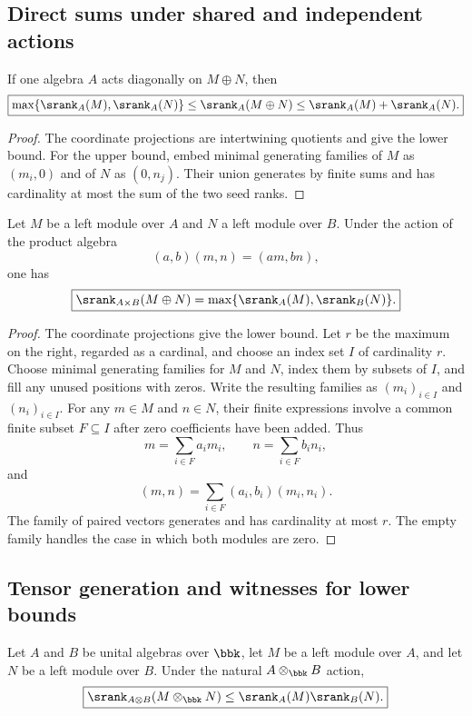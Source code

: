 \subsection{Direct sums under shared and independent actions}
\begin{proposition}
\label{prop:shared-direct-sum}
If one algebra $A$ acts diagonally on $M\oplus N$, then
\[
\boxed{
\max\{\srank_A(M),\srank_A(N)\}
\leq\srank_A(M\oplus N)
\leq\srank_A(M)+\srank_A(N).
}
\]
\end{proposition}

\begin{proof}
The coordinate projections are intertwining quotients and give the lower bound.  For the upper bound, embed minimal generating families of $M$ as $(m_i,0)$ and of $N$ as $(0,n_j)$. Their union generates by finite sums and has cardinality at most the sum of the two seed ranks.
\end{proof}

\begin{theorem}
\label{thm:independent-direct-sum}
Let $M$ be a left module over $A$ and $N$ a left module over $B$.  Under the action of the product algebra
\[
(a,b)(m,n)=(am,bn),
\]
one has
\[
\boxed{
\srank_{A\times B}(M\oplus N)
=
\max\{\srank_A(M),\srank_B(N)\}.
}
\]
\end{theorem}

\begin{proof}
The coordinate projections give the lower bound. Let $r$ be the maximum on the right, regarded as a cardinal, and choose an index set $I$ of cardinality $r$. Choose minimal generating families for $M$ and $N$, index them by subsets of $I$, and fill any unused positions with zeros. Write the resulting families as $(m_i)_{i\in I}$ and $(n_i)_{i\in I}$. For any $m\in M$ and $n\in N$, their finite expressions involve a common finite subset $F\subseteq I$ after zero coefficients have been added. Thus
\[
m=\sum_{i\in F}a_im_i,
\qquad
n=\sum_{i\in F}b_in_i,
\]
and
\[
(m,n)=\sum_{i\in F}(a_i,b_i)(m_i,n_i).
\]
The family of paired vectors generates and has cardinality at most $r$. The empty family handles the case in which both modules are zero.
\end{proof}

\subsection{Tensor generation and witnesses for lower bounds}
\begin{proposition}
\label{prop:tensor-bound}
Let $A$ and $B$ be unital algebras over $\bbk$, let $M$ be a left module over $A$, and let $N$ be a left module over $B$.  Under the natural $A\otimes_{\bbk}B$ action,
\[
\boxed{
\srank_{A\otimes B}(M\otimes_{\bbk}N)
\leq
\srank_A(M)\srank_B(N).
}
\]
\end{proposition}

